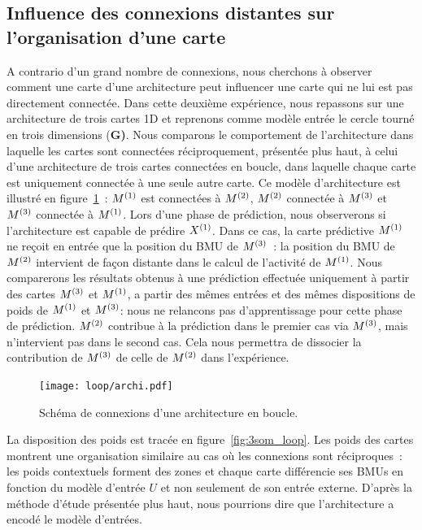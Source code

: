 \documentclass[../main]{subfiles}
\begin{document}
\subsection{Influence des connexions distantes sur l'organisation d'une carte}

A contrario d'un grand nombre de connexions, nous cherchons à observer comment une carte d'une architecture peut influencer une carte qui ne lui est pas directement connectée.
Dans cette deuxième expérience, nous repassons sur une architecture de trois cartes 1D et reprenons comme modèle entrée le cercle tourné en trois dimensions (\textbf{G)}. 
Nous comparons le comportement de l'architecture dans laquelle les cartes sont connectées réciproquement, présentée plus haut, à celui d'une architecture de trois cartes connectées en boucle, dans laquelle chaque carte est uniquement connectée à une seule autre carte. 
Ce modèle d'architecture est illustré en figure~\ref{fig:archi_loop}~: $M^{({1})}$ est connectées à $M^{({2})}$, $M^{({2})}$ connectée à $M^{({3})}$ et $M^{({3})}$ connectée à $M^{({1})}$.
Lors d'une phase de prédiction, nous observerons si l'architecture est capable de prédire $X^{({1})}$. Dans ce cas, la carte prédictive $M^{({1})}$ ne reçoit en entrée que la position du BMU de $M^{({3})}$~: la position du BMU de $M^{({2})}$ intervient de façon distante dans le calcul de l'activité de $M^{({1})}$.
Nous comparerons les résultats obtenus à une prédiction effectuée uniquement à partir des cartes $M^{({3})}$ et $M^{({1})}$, a partir des mêmes entrées et des mêmes dispositions de poids de $M^{({1})}$ et $M^{({3})}$: nous ne relancons pas d'apprentissage pour cette phase de prédiction.
$M^{({2})}$ contribue à la prédiction dans le premier cas via $M^{({3})}$, mais n'intervient pas dans le second cas.
Cela nous permettra de dissocier la contribution de $M^{({3})}$ de celle de $M^{({2})}$ dans l'expérience.


\begin{figure}[h!]
	\centering\texttt{[image: loop/archi.pdf]}
	\caption{Schéma de connexions d'une architecture en \og boucle\fg{}. \label{fig:archi_loop}}
\end{figure}

La disposition des poids est tracée  en figure~\ref{fig:3som_loop}.
Les poids des cartes montrent une organisation similaire au cas où les connexions sont réciproques~: les poids contextuels forment des zones et chaque carte différencie ses BMUs en fonction du modèle d'entrée $U$ et non seulement de son entrée externe.
D'après la méthode d'étude présentée plus haut, nous pourrions dire que l'architecture a encodé le modèle d'entrées.
\end{document}
